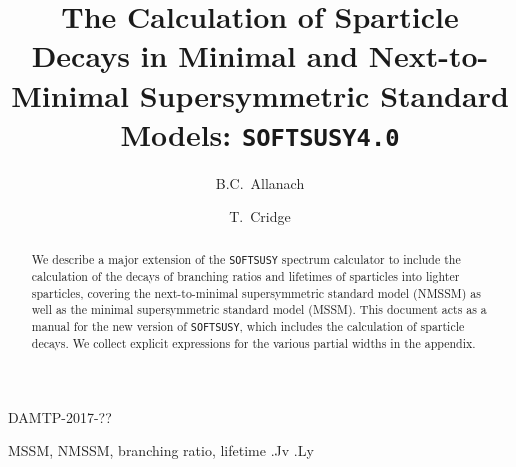 \documentclass[final,3p,times,pdflatex]{elsarticle}
\begin{document}
\begin{frontmatter}

\begin{flushright}
DAMTP-2017-??\\
\end{flushright}

\title{The Calculation of Sparticle Decays in Minimal and Next-to-Minimal Supersymmetric Standard Models: {\tt SOFTSUSY4.0}}

\author[damtp]{B.C.~Allanach}
\author[damtp]{T.~Cridge}
\address[damtp]{DAMTP, CMS, University of Cambridge, Wilberforce road,
  Cambridge, CB3  0WA, United Kingdom}
\begin{abstract}
We describe a major extension of the {\tt SOFTSUSY} spectrum calculator to
include 
the calculation of the decays of branching ratios and lifetimes of sparticles
into lighter 
sparticles, covering  the next-to-minimal supersymmetric standard model
(NMSSM) as 
well as the minimal supersymmetric standard model (MSSM).
This document
acts as a manual for the
new version of {\tt SOFTSUSY}, which includes the calculation of sparticle
decays. We collect explicit expressions for the various partial widths in the
appendix. 
\end{abstract}

\begin{keyword}
MSSM, NMSSM, branching ratio, lifetime
.Jv
.Ly
\end{keyword}
\end{frontmatter}
\end{document}

